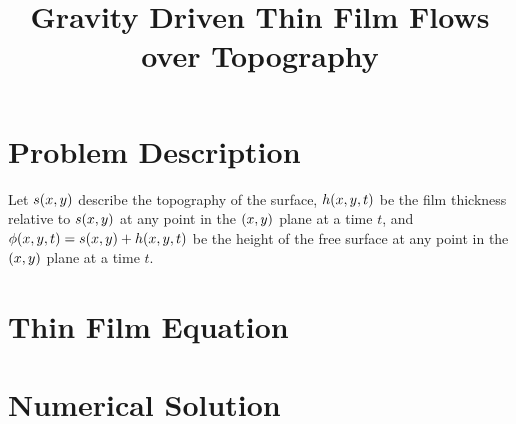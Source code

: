 \documentclass[letterpaper]{article}
\title{Gravity Driven Thin Film Flows over Topography}
\date{}
\begin{document}
 
\maketitle

\section{Problem Description}

Let $s\!\left( x, y \right)$ describe the topography of the surface, 
$h\!\left( x,y,t \right)$ be the film thickness relative to $s\!\left( x,y \right)$ at any point in the $\left( x,y \right)$ plane at a time $t$, 
and $\phi\!\left( x,y,t \right) = s\!\left( x,y \right) + h\!\left( x,y,t \right)$ be the height of the free surface at any point in the $\left( x,y \right)$ plane at a time $t$.

\section{Thin Film Equation}


\section{Numerical Solution}

 
\newpage
\printbibliography
\end{document}
